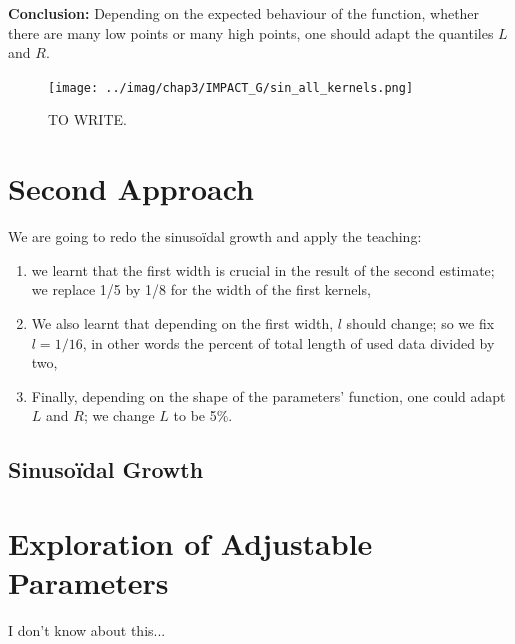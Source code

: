 \documentclass[11pt]{book}
\begin{document}
\textbf{Conclusion:} Depending on the expected behaviour of the function, whether there are many low points or many high points, one should adapt the quantiles $L$ and $R$.


\begin{figure}
\centering
\texttt{[image: ../imag/chap3/IMPACT\_G/sin\_all\_kernels.png]}
\caption{TO WRITE.}
\label{fig:impact_g_sin}
\end{figure}




\section{Second Approach}
We are going to redo the sinusoïdal growth and apply the teaching: 

\begin{enumerate}
\item we learnt that the first width is crucial in the result of the second estimate; we replace 1/5 by 1/8 for the width of the first kernels,
\item We also learnt that depending on the first width, $l$ should change; so we fix $l = 1/16$, in other words the percent of total length of used data divided by two,
\item Finally, depending on the shape of the parameters' function, one could adapt $L$ and $R$; we change $L$ to be 5$\%$.
\end{enumerate}

\subsection{Sinusoïdal Growth}





\section{Exploration of Adjustable Parameters}
\label{section:exploration}


I don't know about this...
\end{document}
